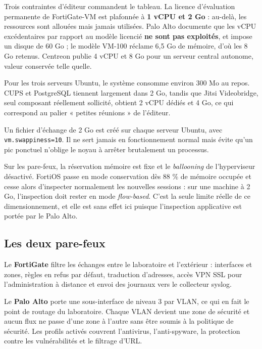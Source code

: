 \documentclass[11pt,a4paper]{article}
\newcommand{\ttb}[1]{\texttt{\small #1}}
\begin{document}
\begin{notebox}
Trois contraintes d'éditeur commandent le tableau. La licence d'évaluation permanente de FortiGate-VM est plafonnée à \textbf{1 vCPU et 2 Go} : au-delà, les ressources sont allouées mais jamais utilisées. Palo Alto documente que les vCPU excédentaires par rapport au modèle licencié \textbf{ne sont pas exploités}, et impose un disque de 60 Go ; le modèle VM-100 réclame 6,5 Go de mémoire, d'où les 8 Go retenus. Centreon publie 4 vCPU et 8 Go pour un serveur central autonome, valeur conservée telle quelle.

Pour les trois serveurs Ubuntu, le système consomme environ 300 Mo au repos. CUPS et PostgreSQL tiennent largement dans 2 Go, tandis que Jitsi Videobridge, seul composant réellement sollicité, obtient 2 vCPU dédiés et 4 Go, ce qui correspond au palier « petites réunions » de l'éditeur.
\end{notebox}

\begin{alertbox}
Un fichier d'échange de 2 Go est créé sur chaque serveur Ubuntu, avec \ttb{vm.swappiness=10}. Il ne sert jamais en fonctionnement normal mais évite qu'un pic ponctuel n'oblige le noyau à arrêter brutalement un processus.

Sur les pare-feux, la réservation mémoire est fixe et le \emph{ballooning} de l'hyperviseur désactivé. FortiOS passe en mode conservation dès 88 \% de mémoire occupée et cesse alors d'inspecter normalement les nouvelles sessions : sur une machine à 2 Go, l'inspection doit rester en mode \emph{flow-based}. C'est la seule limite réelle de ce dimensionnement, et elle est sans effet ici puisque l'inspection applicative est portée par le Palo Alto.
\end{alertbox}

\subsection{Les deux pare-feux}
Le \textbf{FortiGate} filtre les échanges entre le laboratoire et l'extérieur : interfaces et zones, règles en refus par défaut, traduction d'adresses, accès VPN SSL pour l'administration à distance et envoi des journaux vers le collecteur syslog.

Le \textbf{Palo Alto} porte une sous-interface de niveau 3 par VLAN, ce qui en fait le point de routage du laboratoire. Chaque VLAN devient une zone de sécurité et aucun flux ne passe d'une zone à l'autre sans être soumis à la politique de sécurité. Les profils activés couvrent l'antivirus, l'anti-spyware, la protection contre les vulnérabilités et le filtrage d'URL.
\end{document}
